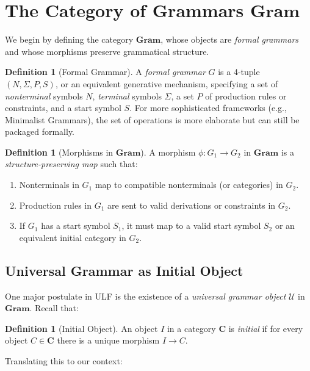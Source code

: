 \documentclass[12pt]{article}
\theoremstyle{plain}
\theoremstyle{definition}
\newtheorem{definition}[theorem]{Definition}
\begin{document}
\section{The Category of Grammars \(\mathbf{Gram}\)}
We begin by defining the category \(\mathbf{Gram}\), whose objects are \emph{formal grammars} and whose morphisms preserve grammatical structure.

\begin{definition}[Formal Grammar]
A \emph{formal grammar} \(G\) is a 4-tuple \((N, \Sigma, P, S)\), or an equivalent generative mechanism, specifying a set of \emph{nonterminal} symbols \(N\), \emph{terminal} symbols \(\Sigma\), a set \(P\) of production rules or constraints, and a start symbol \(S\). For more sophisticated frameworks (e.g., Minimalist Grammars), the set of operations is more elaborate but can still be packaged formally.
\end{definition}

\begin{definition}[Morphisms in \(\mathbf{Gram}\)]
A morphism \(\phi: G_1 \to G_2\) in \(\mathbf{Gram}\) is a \emph{structure-preserving map} such that:
\begin{enumerate}
    \item Nonterminals in \(G_1\) map to compatible nonterminals (or categories) in \(G_2\).
    \item Production rules in \(G_1\) are sent to valid derivations or constraints in \(G_2\).
    \item If \(G_1\) has a start symbol \(S_1\), it must map to a valid start symbol \(S_2\) or an equivalent initial category in \(G_2\).
\end{enumerate}
\end{definition}

\subsection{Universal Grammar as Initial Object}
One major postulate in ULF is the existence of a \emph{universal grammar object} \(\mathcal{U}\) in \(\mathbf{Gram}\). Recall that:

\begin{definition}[Initial Object]
An object \(I\) in a category \(\mathbf{C}\) is \emph{initial} if for every object \(C \in \mathbf{C}\) there is a unique morphism \(I \to C\).
\end{definition}

Translating this to our context:
\end{document}
